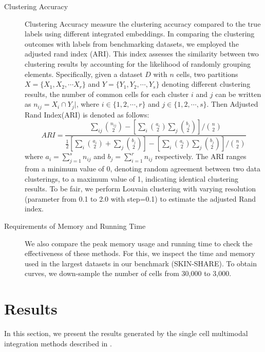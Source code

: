 \begin{description}
	\item[Clustering Accuracy] Clustering Accuracy measure the clustering accuracy compared to the true labels using different integrated embeddings. In comparing the clustering outcomes with labels from benchmarking datasets, we employed the adjusted rand index (ARI)\citep{hubert1985ARI}. This index assesses the similarity between two clustering results by accounting for the likelihood of randomly grouping elements. Specifically, given a dataset $D$ with $n$ cells, two partitions $ X = \{ X_{1}, X_{2}, \cdots X_{r} \} $ and $ Y = \{ Y_{1}, Y_{2}, \cdots, Y_{s} \} $ denoting different clustering results, the number of common cells for each cluster $i$ and $j$ can be written as $n_{ij} = X_{i} \cap Y_{j} |$, where $ i \in \{1, 2, \cdots, r \} $ and $ j \in \{1, 2, \cdots, s \} $. Then Adjusted Rand Index(ARI) is denoted as follows:
	\begin{equation}
		ARI = \frac{\sum_{ij} {n_{ij} \choose 2} - [ \sum_{i} {a_{i} \choose 2} \sum_{j} {b_{j} \choose 2 } ] / {n \choose 2}}{\frac{1}{2} [\sum_{i} {a_{i} \choose 2 } + \sum_{j} {b_{j} \choose 2}] - [\sum_{i} {a_{i} \choose 2} \sum_{j} {b_{j} \choose 2 } ] / {n \choose 2} }
	\end{equation}
	where $ a_{i} = \sum_{j=1}^{s} n_{ij} $ and $ b_{j} = \sum_{i=1}^{r} n_{ij} $ respectively. The ARI ranges from a minimum value of 0, denoting random agreement between two data clusterings, to a maximum value of 1, indicating identical clustering results.  To be fair, we perform Louvain clustering with varying resolution (parameter from 0.1 to 2.0 with step=0.1) to estimate the adjusted Rand index. 
	\item[Requirements of Memory and Running Time] We also compare the peak memory usage and running time to check the effectiveness of these methods. For this, we inspect the time and memory used in the largest datasets in our benchmark (SKIN-SHARE). To obtain curves, we down-sample the number of cells from 30,000 to 3,000.
\end{description}


\label{MOJITOO:exp:statistic}


\section{Results}
\label{MOJITOO:out}
In this section, we present the results generated by the single cell multimodal integration methods described in .

